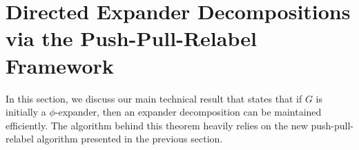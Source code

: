 \documentclass[11pt]{article}
\newcommand{\mprobst}[1]{{\bf \color{Red} Max: #1}}
\begin{document}
\begin{comment}
\\
This established that the potential function remains non-negative over all actions. Hence, we can bound the run time by $\Phi(0) = O(h \cdot \sum_{v} \Delta^+(v) + \Delta^-(v))$. \mprobst{This sentence is just not true if the initial flow is non-zero. Even then it swallows the amount of flow placed that is absorbed.}
\end{proof}

\end{comment}

\section{Directed Expander Decompositions via the Push-Pull-Relabel Framework}
\label{sec:dirExpanderDecomp}

In this section, we discuss our main technical result that states that if $G$ is initially a $\phi$-expander, then an expander decomposition can be maintained efficiently. The algorithm behind this theorem heavily relies on the new push-pull-relabel algorithm presented in the previous section.
\end{document}
